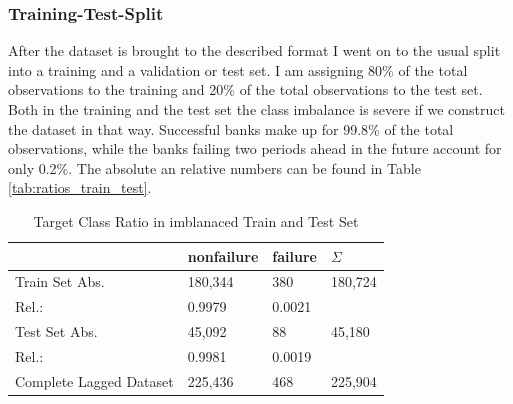 \documentclass[12pt,a4paper]{article}
\begin{document}
\subsubsection*{Training-Test-Split}
After the dataset is brought to the described format I went on to the usual split into a training and a validation or test set. I am assigning 80\% of the total observations to the training and 20\% of the total observations to the test set. Both in the training and the test set the class imbalance is severe if we construct the dataset in that way. Successful banks make up for 99.8\% of the total observations, while the banks failing two periods ahead in the future account for only 0.2\%. The absolute an relative numbers can be found in Table \vref{tab:ratios_train_test}.
\begin{table}[]
\centering
\begin{tabular}{@{}llll@{}}
\toprule
 & nonfailure & failure & $\Sigma$ \\ \midrule
Train Set Abs. & 180,344 & 380 & 180,724 \\
Rel.: & 0.9979 & 0.0021 &  \\
Test Set Abs. & 45,092 & 88 & 45,180 \\
Rel.: & 0.9981 & 0.0019 &  \\ \midrule
Complete Lagged Dataset & 225,436 & 468 & 225,904
\end{tabular}
\caption{Target Class Ratio in imblanaced Train and Test Set}
\label{tab:ratios_train_test}
\end{table}
\end{document}

